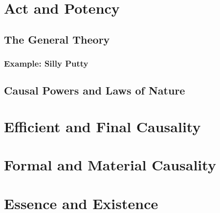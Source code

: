 \documentclass[twocolumn]{article}
\begin{document}
\section{Act and Potency}

\subsection{The General Theory}

\subsubsection{Example: Silly Putty}

\subsection{Causal Powers and Laws of Nature}

\section{Efficient and Final Causality}

\section{Formal and Material Causality}

\section{Essence and Existence}


\end{document}
